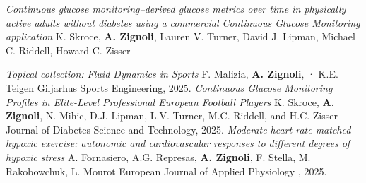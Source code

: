 \documentclass[helvetica,openbib,logo,notitle,flagCMYK,totpages]{europecv}
\begin{document}
\begin{europecv}
{        %
    \emph{Continuous glucose monitoring–derived glucose metrics over time in physically active adults without diabetes using a commercial Continuous Glucose Monitoring application}
	\newline 
	K. Skroce, \textbf{A. Zignoli}, Lauren V. Turner, David J. Lipman, Michael C. Riddell, Howard C. Zisser
    \newline
	\newline
    
    
    \emph{Topical collection: Fluid Dynamics in Sports}
	\newline 
	F. Malizia, \textbf{A. Zignoli}, · K.E. Teigen Giljarhus
    \newline 
	Sports Engineering, 2025. 
    \newline
	\newline
    \emph{Continuous Glucose Monitoring Profiles in Elite-Level Professional European Football Players}
	\newline 
	K. Skroce, \textbf{A. Zignoli}, N. Mihic, D.J. Lipman, L.V. Turner, M.C. Riddell, and H.C. Zisser
    \newline 
	Journal of Diabetes Science and Technology, 2025. 
    \newline
	\newline
    \emph{Moderate heart rate-matched hypoxic exercise: autonomic and cardiovascular responses to different degrees of hypoxic stress}
	\newline 
	A. Fornasiero, A.G. Represas, \textbf{A. Zignoli}, F. Stella, M. Rakobowchuk, L. Mourot
    \newline 
	European Journal of Applied Physiology , 2025. 
    \newline
	\newline
}


\end{europecv}
\end{document}
